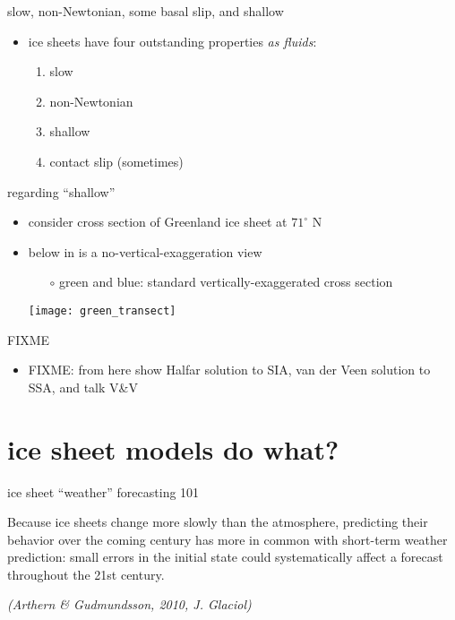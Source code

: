 \documentclass[hide notes,intlimits]{beamer}
\begin{document}
\begin{frame}{slow, non-Newtonian, some basal slip, and shallow}

\begin{itemize}
\item ice sheets have four outstanding properties \emph{as fluids}:
  \begin{enumerate}
  \item slow
  \item non-Newtonian
  \item \alert{shallow}
  \item contact slip (sometimes)
  \end{enumerate}
\end{itemize}
\end{frame}


\begin{frame}{regarding ``shallow''}

\begin{itemize}
\item consider cross section of Greenland ice sheet at $71^\circ$ N
\item below in {\color{dark red}{red}} is a no-vertical-exaggeration view
\small
  \begin{itemize}
  \item[$\circ$] green and blue: standard vertically-exaggerated cross section
  \end{itemize}
  \begin{center}
    \texttt{[image: green\_transect]}
  \end{center}
\end{itemize}
\end{frame}


\begin{frame}{FIXME}

\begin{itemize}
\item FIXME:  from here show Halfar solution to SIA, van der Veen solution to SSA, and talk V\&V
\end{itemize}
\end{frame}


\section{ice sheet models do what?}

\begin{frame}{ice sheet ``weather'' forecasting 101}

Because ice sheets change more slowly than the atmosphere, predicting their
behavior over the coming century has more in common with short-term
weather prediction: \alert{small errors in the initial state could
systematically affect a forecast throughout the 21st century}.

\medskip
\emph{(Arthern \& Gudmundsson, 2010, J. Glaciol)}
\end{frame}
\end{document}
